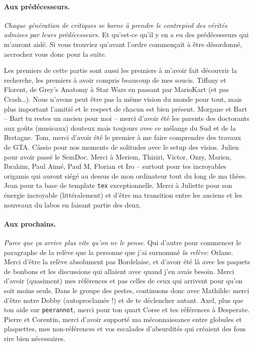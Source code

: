 \medskip

\paragraph*{Aux prédécesseurs.}
\emph{Chaque génération de critiques se borne à prendre le contrepied des vérités admises par leurs prédécesseurs.} Et qu'est-ce qu'il y en a eu des prédécesseurs qui m'auront aidé. Si vous trouviez qu'avant l'ordre commençait à être désordonné, accrochez vous donc pour la suite.

Les premiers de cette partie sont aussi les premiers à m'avoir fait découvrir la recherche, les premiers à avoir compris beaucoup de mes soucis.
Tiffany et Florent, de Grey's Anatomy à Star Wars en passant par MarioKart (et pas Crash\dots). Nous n'avons peut être pas la même vision du monde pour tout, mais plus important l'amitié et le respect de chacun est bien présent.
Morgane et Bart -- Bart tu restes un ancien pour moi -- merci d'avoir été les parents des doctorants aux goûts (musicaux) douteux mais toujours avec ce mélange du Sud et de la Bretagne.
Tom, merci d'avoir été le premier à me faire comprendre des travaux de GTA.
C\'{a}ssio pour nos moments de solitudes avec le setup des visios.
Julien pour avoir passé le SemDoc.
Merci à Meriem, Thiziri, Victor, Ozzy, Marien, Ibrahim, Paul Aimé, Paul M,  Florian et Iro -- surtout pour tes incroyables origamis qui auront siégé au dessus de mon ordinateur tout du long de ma thèse.
Jean pour ta base de template \texttt{tex} exceptionnelle.
Merci à Juliette pour son énergie incroyable (littéralement) et d'être ma transition entre les anciens et les nouveaux du labos en faisant partie des deux.

\medskip
\paragraph*{Aux prochains.}
\emph{Parce que ça arrive plus vite qu'on ne le pense.}
Qui d'autre pour commencer le paragraphe de la relève que la personne que j'ai surnommé \emph{la relève}: Orlane. Merci d'être la relève absolument pas Bordelaise, et d'avoir été là avec les paquets de bonbons et les discussions qui allaient avec quand j'en avais besoin. Merci d'avoir (quasiment) mes références et pas celles de ceux qui arrivent pour qu'on soit moins seuls.
Dans le groupe des pestes, continuons donc avec Mathilde: merci d'être notre Dobby (autoproclamée !) et de te déclencher autant.
Axel, plus que ton aide sur \texttt{peerannot}, merci pour ton quart Corse et tes références à Desperate.
Pierre et Corentin, merci d'avoir supporté ma méconnaissance entre globules et plaquettes, mes non-références et vos escalades d'absurdités qui créaient des fous rire bien nécessaires.

